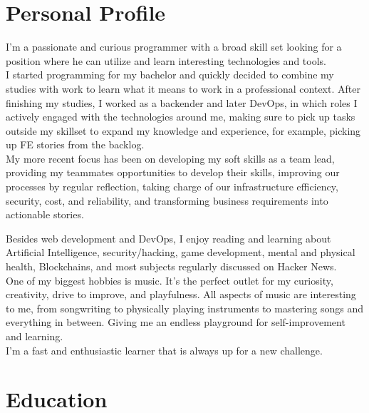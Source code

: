 \documentclass[10pt]{article} %
\begin{document}
\section{Personal Profile}

I'm a passionate and curious programmer with a broad skill set looking for a position where he can utilize and learn interesting technologies and tools. \\

I started programming for my bachelor and quickly decided to combine my studies with work to learn what it means to work in a professional context. After finishing my studies, I worked as a backender and later DevOps, in which roles I actively engaged with the technologies around me, making sure to pick up tasks outside my skillset to expand my knowledge and experience, for example, picking up FE stories from the backlog. \\

My more recent focus has been on developing my soft skills as a team lead, providing my teammates opportunities to develop their skills, improving our processes by regular reflection, taking charge of our infrastructure efficiency, security, cost, and reliability, and transforming business requirements into actionable stories.

Besides web development and DevOps, I enjoy reading and learning about Artificial Intelligence, security/hacking, game development, mental and physical health, Blockchains, and most subjects regularly discussed on Hacker News. \\

One of my biggest hobbies is music. It's the perfect outlet for my curiosity, creativity, drive to improve, and playfulness. All aspects of music are interesting to me, from songwriting to physically playing instruments to mastering songs and everything in between. Giving me an endless playground for self-improvement and learning.  \\

I'm a fast and enthusiastic learner that is always up for a new challenge.


\section{Education}
\end{document}
